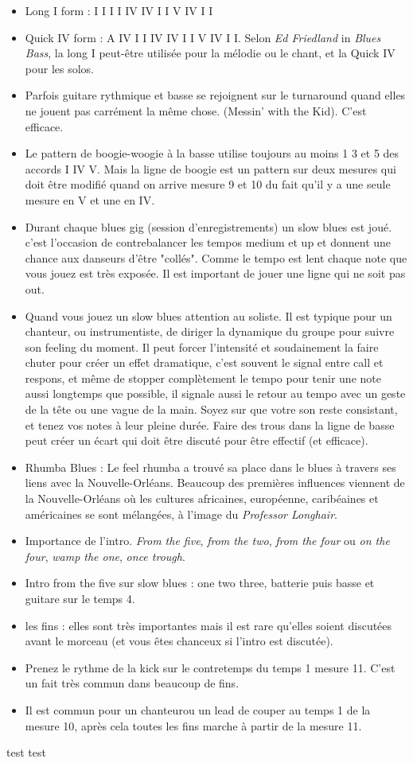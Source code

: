 \documentclass[a4paper]{article}
\begin{document}
\begin{itemize}
\item Long I form : I I I I IV IV I I V IV I I
\item Quick IV form : A IV I I IV IV I I V IV I I. Selon \emph{Ed Friedland} in \emph{Blues Bass}, la long I peut-être utilisée pour la mélodie ou le chant, et la Quick IV pour les solos.
\item Parfois guitare rythmique et basse se rejoignent sur le turnaround quand elles ne jouent pas carrément la même chose. (Messin' with the Kid). C'est efficace.
\item Le pattern de boogie-woogie à la basse utilise toujours au moins 1 3 et 5 des accords I IV V. Mais la ligne de boogie est un pattern sur deux mesures qui doit être modifié quand on arrive mesure 9 et 10 du fait qu'il y a une seule mesure en V et une en IV.
\item Durant chaque blues gig (session d'enregistrements) un slow blues est joué. c'est l'occasion de contrebalancer les tempos medium et up et donnent une chance aux danseurs d'être "collés". Comme le tempo est lent chaque note que vous jouez est très exposée. Il est important de jouer une ligne qui ne soit pas out.
\item Quand vous jouez un slow blues attention au soliste. Il est typique pour un chanteur, ou instrumentiste, de diriger la dynamique du groupe pour suivre son feeling du moment. Il peut forcer l'intensité et soudainement la faire chuter pour créer un effet dramatique, c'est souvent le signal entre call et respons, et même de stopper complètement le tempo pour tenir une note aussi longtemps que possible, il signale aussi le retour au tempo avec un geste de la tête ou une vague de la main. Soyez sur que votre son reste consistant, et tenez vos notes à leur pleine durée. Faire des trous dans la ligne de basse peut créer un écart qui doit être discuté pour être effectif (et efficace).
\item Rhumba Blues : Le feel rhumba a trouvé sa place dans le blues à travers ses liens avec la Nouvelle-Orléans. Beaucoup des premières influences viennent de la Nouvelle-Orléans où les cultures africaines, européenne, caribéaines et américaines se sont mélangées, à l'image du \emph{Professor Longhair}.
\item Importance de l'intro. \emph{From the five}, \emph{from the two}, \emph{from the four} ou \emph{on the four}, \emph{wamp the one}, \emph{once trough}.
\item Intro from the five sur slow blues : one two three, batterie puis basse et guitare sur le temps 4.
\item les fins : elles sont très importantes mais il est rare qu'elles soient discutées avant le morceau (et vous êtes chanceux si l'intro est discutée).
\item Prenez le rythme de la kick sur le contretemps du temps 1 mesure 11. C'est un fait très commun dans beaucoup de fins. 
\item Il est commun pour un chanteurou un lead de couper au temps 1 de la mesure 10, après cela toutes les fins marche à partir de la mesure 11.
\end{itemize}

test test
\end{document}
